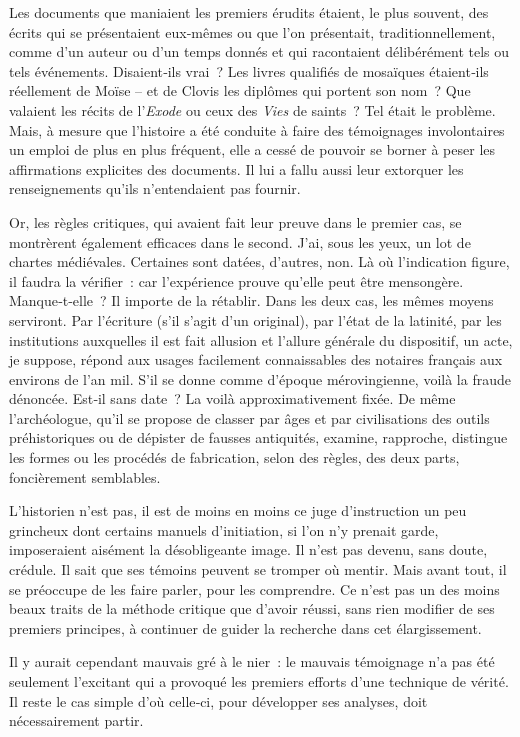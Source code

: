 \documentclass[french,twoside]{book} %
\newcommand{\astermono}{\medskip\centerline{\color{rubric}\large\selectfont{\syms ✻}}\medskip\par}%
\begin{document}
\astermono

\noindent Les documents que maniaient les premiers érudits étaient, le plus souvent, des écrits qui se présentaient eux‑mêmes ou que l’on présentait, traditionnellement, comme d’un auteur ou d’un temps donnés et qui racontaient délibérément tels ou tels événements. Disaient‑ils vrai ? Les livres qualifiés de mosaïques étaient‑ils réellement de Moïse – et de Clovis les diplômes qui portent son nom ? Que valaient les récits de l’\emph{Exode} ou ceux des \emph{Vies} de saints ? Tel était le problème. Mais, à mesure que l’histoire a été conduite à faire des témoignages involontaires un emploi de plus en plus fréquent, elle a cessé de pouvoir se borner à peser les affirmations explicites des documents. Il lui a fallu aussi leur extorquer les renseignements qu’ils n’entendaient pas fournir.\par
Or, les règles critiques, qui avaient fait leur preuve dans le premier cas, se montrèrent également efficaces dans le second. J’ai, sous les yeux, un lot de chartes médiévales. Certaines sont datées, d’autres, non. Là  
\label{p41} où l’indication figure, il faudra la vérifier : car l’expérience prouve qu’elle peut être mensongère. Manque‑t‑elle ? Il importe de la rétablir. Dans les deux cas, les mêmes moyens serviront. Par l’écriture (s’il s’agit d’un original), par l’état de la latinité, par les institutions auxquelles il est fait allusion et l’allure générale du dispositif, un acte, je suppose, répond aux usages facilement connaissables des notaires français aux environs de l’an mil. S’il se donne comme d’époque mérovingienne, voilà la fraude dénoncée. Est‑il sans date ? La voilà approximativement fixée. De même l’archéologue, qu’il se propose de classer par âges et par civilisations des outils préhistoriques ou de dépister de fausses antiquités, examine, rap­proche, distingue les formes ou les procédés de fabrication, selon des règles, des deux parts, foncièrement semblables.\par
L’historien n’est pas, il est de moins en moins ce juge d’instruction un peu grincheux dont certains manuels d’initiation, si l’on n’y prenait garde, imposeraient aisément la désobligeante image. Il n’est pas devenu, sans doute, crédule. Il sait que ses témoins peuvent se tromper où mentir. Mais avant tout, il se préoccupe de les faire parler, pour les comprendre. Ce n’est pas un des moins beaux traits de la méthode critique que d’avoir réussi, sans rien modifier de ses premiers principes, à continuer de guider la recherche dans cet élargissement.\par
Il y aurait cependant mauvais gré à le nier : le mauvais témoignage n’a pas été seulement l’excitant qui a provoqué les premiers efforts d’une technique de vérité. Il reste le cas simple d’où celle‑ci, pour développer ses analyses, doit nécessairement partir.\par
\bigbreak
\end{document}
